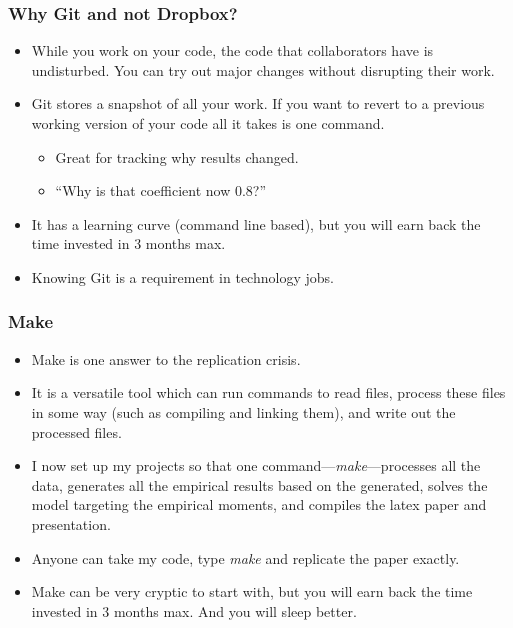 \documentclass[english,xcolor=svgnames]{beamer}
\begin{document}
\begin{frame}
\frametitle[alignment=center]{Why Git and not Dropbox?}
\begin{itemize}
	\item While you work on your code, the code that collaborators have is undisturbed. You can try out major changes without disrupting their work.
	\item Git stores a snapshot of all your work. If you want to revert to a previous working version of your code all it takes is one command.
	\begin{itemize}
		\item Great for tracking why results changed.
		\item ``Why is that coefficient now 0.8?''
	\end{itemize}
	\item It has a learning curve (command line based), but you will earn back the time invested in 3 months max.
	\item Knowing Git is a requirement in technology jobs.
\end{itemize}
\end{frame}


\begin{frame}
\frametitle[alignment=center]{Make}
\begin{itemize}
	\item Make is one answer to the replication crisis.
	\item It is a versatile tool which can run commands to read files, process these files in some way (such as compiling and linking them), and write out the processed files.
	\item I now set up my projects so that one command---\emph{make}---processes all the data, generates all the empirical results based on the generated, solves the model targeting the empirical moments, and compiles the latex paper and presentation.
	\item Anyone can take my code, type \emph{make} and replicate the paper exactly.
	\item Make can be very cryptic to start with, but you will earn back the time invested in 3 months max. And you will sleep better.
\end{itemize}
\end{frame}
\end{document}
